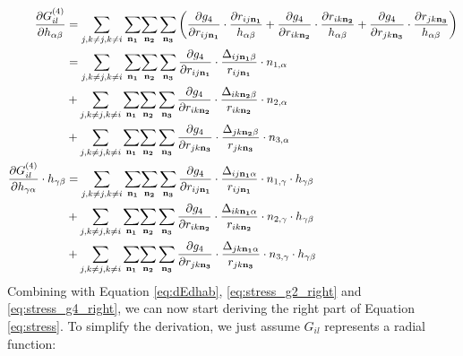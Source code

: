 \documentclass[final,1p,times]{elsarticle}
\begin{document}
\begin{align}
\frac{\partial G_{il}^{(4)}}{\partial h_{\alpha\beta}} & =
    \sum_{j, k \neq j, k \neq i}{
        \sum_{\mathbf{n_1}}}{\sum_{\mathbf{n_2}}{\sum_{\mathbf{n_3}}{
    \left(
        \frac{\partial g_4}{\partial r_{ij\mathbf{n_1}}}\cdot\frac{\partial r_{ij\mathbf{n_1}}}{h_{\alpha\beta}} +
        \frac{\partial g_4}{\partial r_{ik\mathbf{n_2}}}\cdot\frac{\partial r_{ik\mathbf{n_2}}}{h_{\alpha\beta}} +
        \frac{\partial g_4}{\partial r_{jk\mathbf{n_3}}}\cdot\frac{\partial r_{jk\mathbf{n_3}}}{h_{\alpha\beta}}
    \right)
}}} \nonumber \\
& =  \sum_{j, k \neq j, k \neq i}{
        \sum_{\mathbf{n_1}}}{\sum_{\mathbf{n_2}}{\sum_{\mathbf{n_3}}{
    \frac{\partial g_4}{\partial r_{ij\mathbf{n_1}}} \cdot 
    \frac{\Delta_{ij\mathbf{n_1}\beta}}{r_{ij\mathbf{n_1}}} \cdot n_{1,\alpha}
}}} \nonumber \\
& + \sum_{j, k \neq j, k \neq i}{
    \sum_{\mathbf{n_1}}}{\sum_{\mathbf{n_2}}{\sum_{\mathbf{n_3}}{
\frac{\partial g_4}{\partial r_{ik\mathbf{n_2}}} \cdot 
\frac{\Delta_{ik\mathbf{n_2}\beta}}{r_{ik\mathbf{n_2}}} \cdot n_{2,\alpha}
}}} \nonumber \\
& + \sum_{j, k \neq j, k \neq i}{
    \sum_{\mathbf{n_1}}}{\sum_{\mathbf{n_2}}{\sum_{\mathbf{n_3}}{
\frac{\partial g_4}{\partial r_{jk\mathbf{n_3}}} \cdot 
\frac{\Delta_{jk\mathbf{n_2}\beta}}{r_{jk\mathbf{n_3}}} \cdot n_{3,\alpha}
}}} \\
\label{eq:stress_g4_right}
\frac{\partial G_{il}^{(4)}}{\partial h_{\gamma\alpha}} \cdot h_{\gamma\beta} & = 
\sum_{j, k \neq j, k \neq i}{
    \sum_{\mathbf{n_1}}}{\sum_{\mathbf{n_2}}{\sum_{\mathbf{n_3}}{
\frac{\partial g_4}{\partial r_{ij\mathbf{n_1}}} \cdot 
\frac{\Delta_{ij\mathbf{n_1}\alpha}}{r_{ij\mathbf{n_1}}} \cdot n_{1,\gamma} \cdot h_{\gamma\beta}
}}} \nonumber \\
& + \sum_{j, k \neq j, k \neq i}{
    \sum_{\mathbf{n_1}}}{\sum_{\mathbf{n_2}}{\sum_{\mathbf{n_3}}{
\frac{\partial g_4}{\partial r_{ik\mathbf{n_2}}} \cdot 
\frac{\Delta_{ik\mathbf{n_1}\alpha}}{r_{ik\mathbf{n_2}}} \cdot n_{2,\gamma} \cdot h_{\gamma\beta}
}}} \nonumber \\
& + \sum_{j, k \neq j, k \neq i}{
    \sum_{\mathbf{n_1}}}{\sum_{\mathbf{n_2}}{\sum_{\mathbf{n_3}}{
\frac{\partial g_4}{\partial r_{jk\mathbf{n_3}}} \cdot 
\frac{\Delta_{jk\mathbf{n_1}\alpha}}{r_{jk\mathbf{n_3}}} \cdot n_{3,\gamma} \cdot h_{\gamma\beta}
}}}
\end{align}
Combining with Equation \ref{eq:dEdhab}, \ref{eq:stress_g2_right} and 
\ref{eq:stress_g4_right}, we can now start deriving the right part of Equation 
\ref{eq:stress}. To simplify the derivation, we just assume $G_{il}$ represents
a radial function:
\newcommand{\dE}{\partial{E^{total}}}
\end{document}
